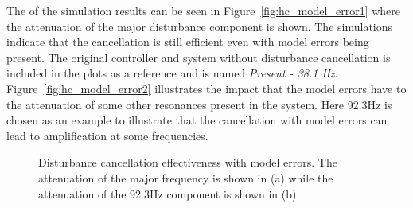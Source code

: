 The \abbrFFT of the simulation results can be seen in Figure~\ref{fig:hc_model_error1} where the attenuation of the major disturbance component is shown. The simulations indicate that the cancellation is still efficient even with model errors being present. The original controller and system without disturbance cancellation is included in the plots as a reference and is named \emph{Present - 38.1 Hz}. Figure~\ref{fig:hc_model_error2} illustrates the impact that the model errors have to the attenuation of some other resonances present in the system. Here 92.3Hz is chosen as an example to illustrate that the cancellation with model errors can lead to amplification at some frequencies.


\begin{figure}[h!]
  \centering %
  \qquad
  \caption{\label{fig:hc_model_error} Disturbance cancellation effectiveness with model errors. The attenuation of the major frequency is shown in (a) while the attenuation of the 92.3Hz component is shown in (b).}
\end{figure}

